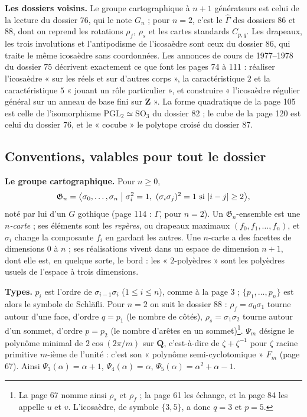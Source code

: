 \documentclass[11pt,a4paper]{article}
\begin{document}
\textbf{Les dossiers voisins.} Le groupe cartographique à $n+1$ générateurs
est celui de la lecture du dossier 76, qui le note $G_n$ ; pour $n = 2$, c'est
le $\widehat{\Gamma}$ des dossiers 86 et 88, dont on reprend les rotations
$\rho_f$, $\rho_s$ et les cartes standards $C_{p,q}$. Les drapeaux, les trois
involutions et l'antipodisme de l'icosaèdre sont ceux du dossier 86, qui
traite le même icosaèdre sans coordonnées. Les annonces de cours de
1977--1978 du dossier 75 décrivent exactement ce que font les pages 74 à
111 : réaliser l'icosaèdre « sur les réels et sur d'autres corps », la
caractéristique $2$ et la caractéristique $5$ « jouant un rôle particulier »,
et construire « l'icosaèdre régulier général sur un anneau de base fini
sur $\mathbf{Z}$ ». La forme quadratique de la page 105 est celle de
l'isomorphisme $\mathrm{PGL}_2 \simeq \mathrm{SO}_3$ du dossier 82 ; le cube
de la page 120 est celui du dossier 76, et le « cocube » le polytope croisé du
dossier 87.

\subsection*{Conventions, valables pour tout le dossier}

\textbf{Le groupe cartographique.} Pour $n \geq 0$,
\[
\mathfrak{G}_n = \bigl\langle \sigma_0, \dots, \sigma_n \bigm| \sigma_i^2 = 1,\
(\sigma_i \sigma_j)^2 = 1 \text{ si } |i - j| \geq 2 \bigr\rangle ,
\]
noté par lui d'un $G$ gothique (page 114 : $\Gamma$, pour $n = 2$). Un
$\mathfrak{G}_n$-ensemble est une \emph{$n$-carte} ; ses éléments sont les
\emph{repères}, ou drapeaux maximaux $(f_0, f_1, \dots, f_n)$, et $\sigma_i$
change la composante $f_i$ en gardant les autres. Une $n$-carte a des facettes
de dimensions $0$ à $n$ ; ses réalisations vivent dans un espace de dimension
$n + 1$, dont elle est, en quelque sorte, le bord : les « $2$-polyèdres » sont
les polyèdres usuels de l'espace à trois dimensions.

\textbf{Types.} $p_i$ est l'ordre de $\sigma_{i-1}\sigma_i$ ($1 \leq i \leq n$),
comme à la page 3 ; $\{p_1, \dots, p_n\}$ est alors le symbole de Schläfli.
Pour $n = 2$ on suit le dossier 88 : $\rho_f = \sigma_0\sigma_1$ tourne autour
d'une face, d'ordre $q = p_1$ (le nombre de côtés), $\rho_s = \sigma_1\sigma_2$
tourne autour d'un sommet, d'ordre $p = p_2$ (le nombre d'arêtes en un
sommet)\footnote{La page 67 nomme ainsi $\rho_s$ et $\rho_f$ ; la page 61 les
échange, et la page 84 les appelle $u$ et $v$. L'icosaèdre, de symbole
$\{3, 5\}$, a donc $q = 3$ et $p = 5$.}. $\Psi_m$ désigne le polynôme minimal
de $2\cos(2\pi/m)$ sur $\mathbf{Q}$, c'est-à-dire de $\zeta + \zeta^{-1}$ pour
$\zeta$ racine primitive $m$-ième de l'unité : c'est son « polynôme
semi-cyclotomique » $F_m$ (page 67). Ainsi $\Psi_3(\alpha) = \alpha + 1$,
$\Psi_4(\alpha) = \alpha$, $\Psi_5(\alpha) = \alpha^2 + \alpha - 1$.
\end{document}

